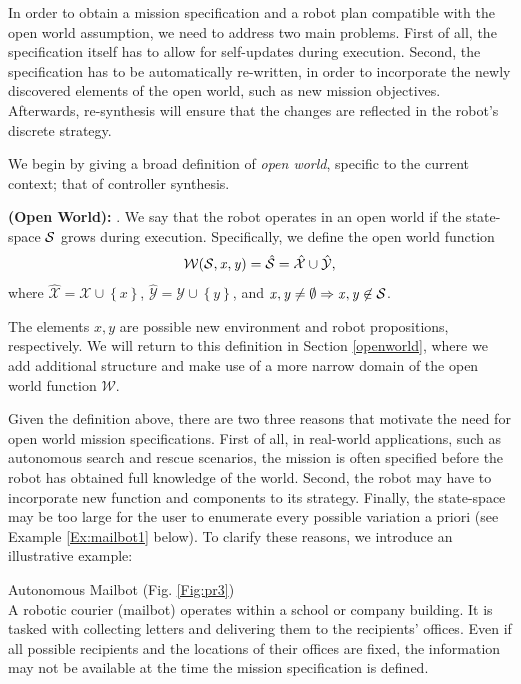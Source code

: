In order to obtain a mission specification and a robot plan compatible with the open world assumption, we need to address two main problems. First of all, the specification itself has to allow for self-updates during execution. Second, the specification has to be automatically re-written, in order to incorporate the newly discovered elements of the open world, such as new mission objectives. Afterwards, re-synthesis will ensure that the changes are reflected in the robot's discrete strategy.

We begin by giving a broad definition of \emph{open world}, specific to the current context; that of controller synthesis.

\begin{myDefinition}\label{Def:openworld}
	\textbf{(Open World):} . We say that the robot operates in an open world if the state-space $\mathcal{S}$ grows during execution. Specifically, we define the open world function $$\mathcal{W}(\mathcal{S}, \mathit{x}, \mathit{y}) = \hat{\mathcal{S}} = \hat{\mathcal{X}} \cup \hat{\mathcal{Y}},$$
	where $\hat{\mathcal{X}} = \mathcal{X} \cup \left\{ \mathit{x} \right\}$, $\hat{\mathcal{Y}} = \mathcal{Y} \cup \left\{ \mathit{y} \right\}$, and $\mathit{x}, \mathit{y} \neq \emptyset \Rightarrow \mathit{x}, \mathit{y} \not \in \mathcal{S} $.
	\end{myDefinition} 
The elements $\mathit{x}, \mathit{y}$ are possible new environment and robot propositions, respectively. We will return to this definition in Section \ref{openworld}, where we add additional structure and make use of a more narrow domain of the open world function $\mathcal{W}$.

Given the definition above, there are two three reasons that motivate the need for open world mission specifications. First of all, in real-world applications, such as autonomous search and rescue scenarios, the mission is often specified before the robot has obtained full knowledge of the world. Second, the robot may have to incorporate new function and components to its strategy. Finally, the state-space may be too large for the user to enumerate every possible variation a priori (see Example \ref{Ex:mailbot1} below).  To clarify these reasons, we introduce an illustrative example:

\begin{myExample}\label{Ex:mailbot1} Autonomous Mailbot (Fig. \ref{Fig:pr3})\\
	A robotic courier (mailbot) operates within a school or company building. It is tasked with collecting letters and delivering them to the recipients' offices. Even if all possible recipients and the locations of their offices are fixed, the information may not be available at the time the mission specification is defined. 
\end{myExample}

